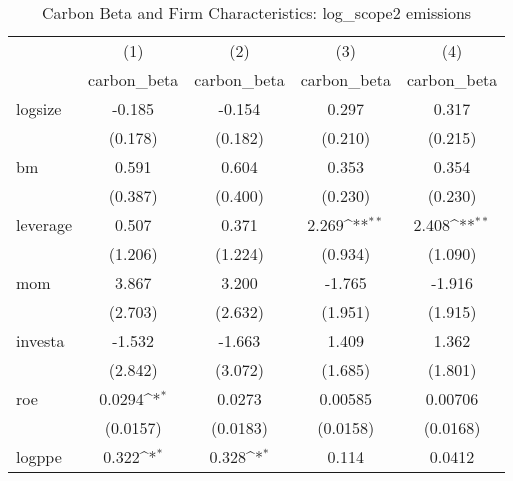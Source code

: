 \begin{table}[htbp]\centering
\def\sym#1{\ifmmode^{#1}\else\(^{#1}\)\fi}
\caption{Carbon Beta and Firm Characteristics: log\_scope2 emissions}
\begin{tabular}{l*{4}{c}}
\hline\hline
                    &\multicolumn{1}{c}{(1)}&\multicolumn{1}{c}{(2)}&\multicolumn{1}{c}{(3)}&\multicolumn{1}{c}{(4)}\\
                    &\multicolumn{1}{c}{carbon\_beta}&\multicolumn{1}{c}{carbon\_beta}&\multicolumn{1}{c}{carbon\_beta}&\multicolumn{1}{c}{carbon\_beta}\\
\hline
logsize             &      -0.185         &      -0.154         &       0.297         &       0.317         \\
                    &     (0.178)         &     (0.182)         &     (0.210)         &     (0.215)         \\
[1em]
bm                  &       0.591         &       0.604         &       0.353         &       0.354         \\
                    &     (0.387)         &     (0.400)         &     (0.230)         &     (0.230)         \\
[1em]
leverage            &       0.507         &       0.371         &       2.269\sym{**} &       2.408\sym{**} \\
                    &     (1.206)         &     (1.224)         &     (0.934)         &     (1.090)         \\
[1em]
mom                 &       3.867         &       3.200         &      -1.765         &      -1.916         \\
                    &     (2.703)         &     (2.632)         &     (1.951)         &     (1.915)         \\
[1em]
investa             &      -1.532         &      -1.663         &       1.409         &       1.362         \\
                    &     (2.842)         &     (3.072)         &     (1.685)         &     (1.801)         \\
[1em]
roe                 &      0.0294\sym{*}  &      0.0273         &     0.00585         &     0.00706         \\
                    &    (0.0157)         &    (0.0183)         &    (0.0158)         &    (0.0168)         \\
[1em]
logppe              &       0.322\sym{*}  &       0.328\sym{*}  &       0.114         &      0.0412         \\

\end{tabular}
\end{table}
